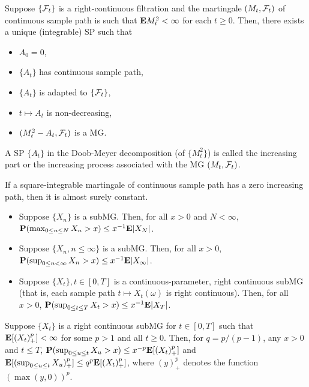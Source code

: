 \begin{theorem*} 
Suppose $\{\mathcal{F}_t\}$ is a right-continuous filtration and the martingale $(M_t,
\mathcal{F}_t)$ of continuous sample path is such that $\mathbf{E} M_t^2 < \infty$ for each $t
\ge 0$. Then, there exists a unique (integrable) SP such that
\begin{itemize}
\item $A_0 = 0$,
\item $\{A_t\}$ has continuous sample path,
\item $\{A_t\}$ is adapted to $\{\mathcal{F}_t\}$,
\item $t \mapsto A_t$ is non-decreasing,
\item $(M_t^2 - A_t, \mathcal{F}_t)$ is a MG.
\end{itemize}
\end{theorem*} 

\begin{definition*} 
A SP $\{A_t\}$ in the Doob-Meyer decomposition (of $\{M_t^2\}$) is called the
increasing part or the increasing process associated with the MG $(M_t, \mathcal{F}_t)$.
\end{definition*} 

\begin{remark*} 
If a square-integrable martingale of continuous sample path has a zero
increasing path, then it is almost surely constant.
\end{remark*} 

\begin{theorem*} 
\begin{itemize}
\item Suppose $\{X_n\}$ is a subMG. Then, for all $x > 0$ and $N < \infty$,
$\mathbf{P}(\max_{0 \le n \le N} X_n > x) \le x^{-1} \mathbf{E}|X_N|$.

\item Suppose $\{X_n, n \le \infty\}$ is a subMG. Then, for all $x > 0$,
$\mathbf{P}(\sup_{0 \le n < \infty} X_n > x) \le x^{-1} \mathbf{E}|X_\infty|$.

\item Suppose $\{X_t\}, t \in [0, T]$ is a continuous-parameter, right
continuous subMG (that is, each sample path $t \mapsto X_t(\omega)$ is right
continuous). Then, for all $x > 0$, $\mathbf{P}(\sup_{0 \le t \le T} X_t > x)
\le x^{-1} \mathbf{E}|X_T|$.
\end{itemize}
\end{theorem*} 

\begin{example*} 
Suppose $\{X_t\}$ is a right continuous subMG for $t \in [0, T]$ such that
$\mathbf{E}[(X_t)^p_+] < \infty$ for some $p > 1$ and all $t \ge 0$. Then, for $q =
p/(p-1)$, any $x > 0$ and $t \le T$, $\mathbf{P}(\sup_{0 \le u \le t} X_u > x) \le
x^{-p} \mathbf{E}[(X_t)^p_+]$ and $\mathbf{E}[ (\sup_{0 \le u \le t} X_u)^p_+] \le q^p
\mathbf{E}[(X_t)^p_+]$, where $(y)^p_+$ denotes the function $(\max(y, 0))^p$.
\end{example*} 



